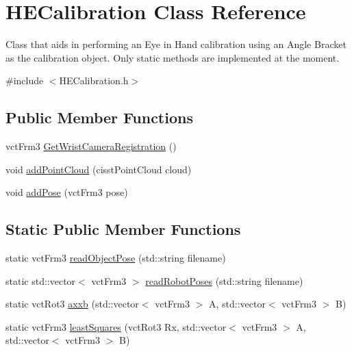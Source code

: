 \hypertarget{class_h_e_calibration}{}\section{H\+E\+Calibration Class Reference}
\label{class_h_e_calibration}


Class that aids in performing an Eye in Hand calibration using an Angle Bracket as the calibration object. Only static methods are implemented at the moment.  




{\ttfamily \#include $<$H\+E\+Calibration.\+h$>$}

\subsection*{Public Member Functions}
\begin{DoxyCompactItemize}
\item 
vct\+Frm3 \hyperlink{class_h_e_calibration_ab2765aa44f4e2359a67ad8e8ab61db64}{Get\+Wrist\+Camera\+Registration} ()
\item 
void \hyperlink{class_h_e_calibration_a26f30368c98903e7b75aaefb5f0f4038}{add\+Point\+Cloud} (cisst\+Point\+Cloud cloud)
\item 
void \hyperlink{class_h_e_calibration_a67724f066c95632eb50a557c9a22d5a3}{add\+Pose} (vct\+Frm3 pose)
\end{DoxyCompactItemize}
\subsection*{Static Public Member Functions}
\begin{DoxyCompactItemize}
\item 
static vct\+Frm3 \hyperlink{class_h_e_calibration_ab58622d16367aa3a095ce63e7d115e15}{read\+Object\+Pose} (std\+::string filename)
\item 
static std\+::vector$<$ vct\+Frm3 $>$ \hyperlink{class_h_e_calibration_a3142d195d52b7d0fba0e3c77c3f37c5f}{read\+Robot\+Poses} (std\+::string filename)
\item 
static vct\+Rot3 \hyperlink{class_h_e_calibration_a85aa37c2653082ffe3b6be85242d2617}{axxb} (std\+::vector$<$ vct\+Frm3 $>$ A, std\+::vector$<$ vct\+Frm3 $>$ B)
\item 
static vct\+Frm3 \hyperlink{class_h_e_calibration_a56ea97fc635496a57f33c573b33fd0af}{least\+Squares} (vct\+Rot3 Rx, std\+::vector$<$ vct\+Frm3 $>$ A, std\+::vector$<$ vct\+Frm3 $>$ B)
\end{DoxyCompactItemize}


